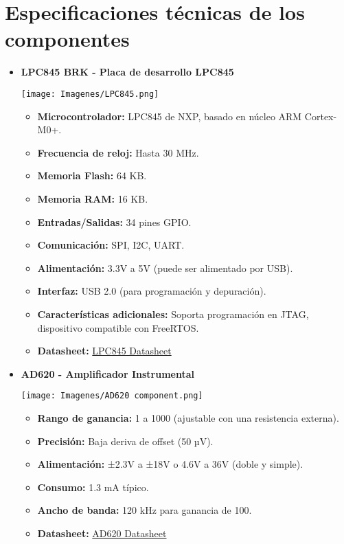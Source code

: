 \section{Especificaciones técnicas de los componentes}

\begin{itemize}
    \item \textbf{LPC845 BRK - Placa de desarrollo LPC845} 
    \begin{center}
        \texttt{[image: Imagenes/LPC845.png]}
    \end{center}
    \begin{itemize}
        \item \textbf{Microcontrolador:} LPC845 de NXP, basado en núcleo ARM Cortex-M0+.
        \item \textbf{Frecuencia de reloj:} Hasta 30 MHz.
        \item \textbf{Memoria Flash:} 64 KB.
        \item \textbf{Memoria RAM:} 16 KB.
        \item \textbf{Entradas/Salidas:} 34 pines GPIO.
        \item \textbf{Comunicación:} SPI, I2C, UART.
        \item \textbf{Alimentación:} 3.3V a 5V (puede ser alimentado por USB).
        \item \textbf{Interfaz:} USB 2.0 (para programación y depuración).
        \item \textbf{Características adicionales:} Soporta programación en JTAG, dispositivo compatible con FreeRTOS.
        \item \textbf{Datasheet:} 
        \href{https://www.nxp.com/products/processors-and-microcontrollers/arm-microcontrollers/general-purpose-mcus/lpc800-arm-cortex-m0-plus-/lpc845-breakout-board-for-lpc84x-family-mcus:LPC845-BRK}{LPC845 Datasheet}
    \end{itemize}

    \item \textbf{AD620 - Amplificador Instrumental} 
    \begin{center}
        \texttt{[image: Imagenes/AD620 component.png]}
    \end{center}
    \begin{itemize}
        \item \textbf{Rango de ganancia:} 1 a 1000 (ajustable con una resistencia externa).
        \item \textbf{Precisión:} Baja deriva de offset (50 µV).
        \item \textbf{Alimentación:} ±2.3V a ±18V o 4.6V a 36V (doble y simple).
        \item \textbf{Consumo:} 1.3 mA típico.
        \item \textbf{Ancho de banda:} 120 kHz para ganancia de 100.
        \item \textbf{Datasheet:} \href{https://www.analog.com/media/en/technical-documentation/data-sheets/AD620.pdf}{AD620 Datasheet}
    \end{itemize}


\end{itemize}
